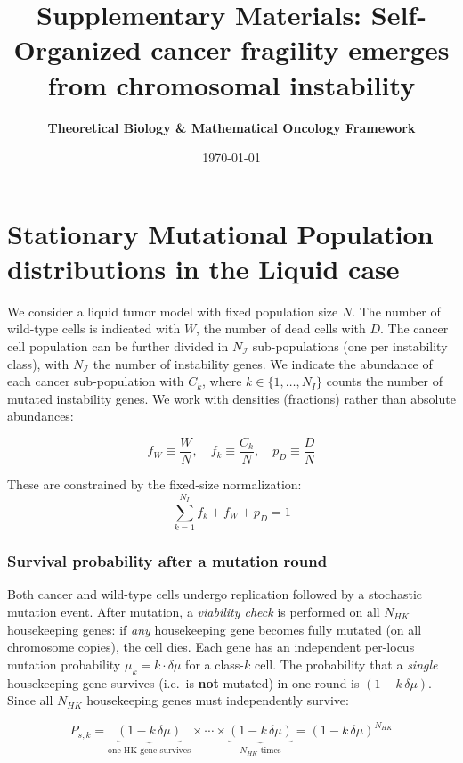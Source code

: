\documentclass[11pt,a4paper]{article}
\title{Supplementary Materials: Self-Organized cancer fragility emerges from chromosomal instability}
\author{\textbf{Theoretical Biology \& Mathematical Oncology Framework}}
\date{\today}
\begin{document}
\maketitle


\section{Stationary Mutational Population distributions in the Liquid case}

We consider a liquid tumor model with fixed population size $N$. The number of wild-type cells is indicated with $W$, the number of dead cells with $D$. The cancer cell population can be further divided in $N_{\mathcal{I}}$ sub-populations (one per instability class), with $N_{\mathcal{I}}$ the number of instability genes. We indicate the abundance of each cancer sub-population with $C_k$, where $k \in \{1, \dots, N_I\}$ counts the number of mutated instability genes. We work with densities (fractions) rather than absolute abundances:

\begin{equation}
    f_W \equiv \frac{W}{N}, \quad f_k \equiv \frac{C_k}{N}, \quad p_D \equiv \frac{D}{N}
\end{equation}

These are constrained by the fixed-size normalization:
\begin{equation}
    \sum_{k=1}^{N_I} f_k + f_W + p_D = 1
\end{equation}

\subsubsection*{Survival probability after a mutation round}

Both cancer and wild-type cells undergo replication followed by a stochastic mutation event. After mutation, a \emph{viability check} is performed on all $N_{HK}$ housekeeping genes: if \emph{any} housekeeping gene becomes fully mutated (on all chromosome copies), the cell dies. Each gene has an independent per-locus mutation probability $\mu_k = k \cdot \delta\mu$ for a class-$k$ cell. The probability that a \emph{single} housekeeping gene survives (i.e.\ is \textbf{not} mutated) in one round is $(1 - k\,\delta\mu)$. Since all $N_{HK}$ housekeeping genes must independently survive:

\begin{equation}
    P_{s,k} = \underbrace{(1 - k\,\delta\mu)}_{\text{one HK gene survives}} \times \cdots \times \underbrace{(1 - k\,\delta\mu)}_{N_{HK}\text{ times}} = (1 - k\,\delta\mu)^{N_{HK}}
\end{equation}
\end{document}
